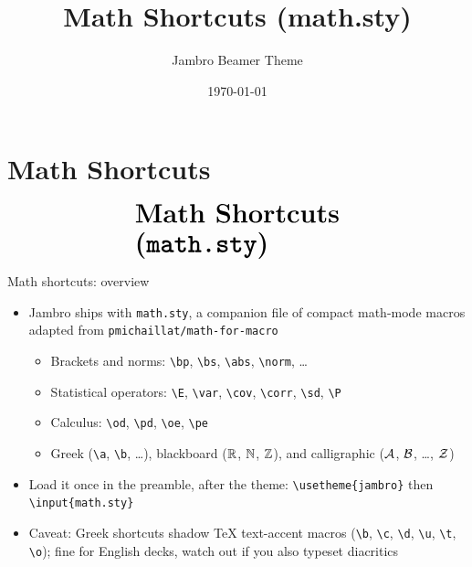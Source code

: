 \documentclass[10pt,itemsep]{beamer}
\title[]{Math Shortcuts (math.sty)}
\author[]{Jambro Beamer Theme}
\date{\today}
\begin{document}
\begin{frame}[plain]
    \titlepage
\end{frame}

\section{Math Shortcuts}
\begin{frame}
    \begin{eqnarray*}
        &\text{{\huge \textbf{Math Shortcuts}}}\\
        &\text{{\huge \textbf{(\texttt{math.sty})}}}\\
    \end{eqnarray*}
\end{frame}

\begin{frame}
    {Math shortcuts: overview}
    \begin{itemize}
        \item Jambro ships with \texttt{math.sty}, a companion file of compact math-mode macros adapted from \texttt{pmichaillat/math-for-macro}
        \begin{itemize}
            \item Brackets and norms: \texttt{\textbackslash bp}, \texttt{\textbackslash bs}, \texttt{\textbackslash abs}, \texttt{\textbackslash norm}, \ldots
            \item Statistical operators: \texttt{\textbackslash E}, \texttt{\textbackslash var}, \texttt{\textbackslash cov}, \texttt{\textbackslash corr}, \texttt{\textbackslash sd}, \texttt{\textbackslash P}
            \item Calculus: \texttt{\textbackslash od}, \texttt{\textbackslash pd}, \texttt{\textbackslash oe}, \texttt{\textbackslash pe}
            \item Greek (\texttt{\textbackslash a}, \texttt{\textbackslash b}, \ldots), blackboard ($\mathbb{R}$, $\mathbb{N}$, $\mathbb{Z}$), and calligraphic ($\mathcal{A}$, $\mathcal{B}$, \ldots, $\mathcal{Z}$)
        \end{itemize}
        \item Load it once in the preamble, after the theme: \texttt{\textbackslash usetheme\{jambro\}} \quad then \quad \texttt{\textbackslash input\{math.sty\}}
        \item Caveat: Greek shortcuts shadow TeX text-accent macros (\texttt{\textbackslash b}, \texttt{\textbackslash c}, \texttt{\textbackslash d}, \texttt{\textbackslash u}, \texttt{\textbackslash t}, \texttt{\textbackslash o}); fine for English decks, watch out if you also typeset diacritics
    \end{itemize}
\end{frame}
\end{document}
